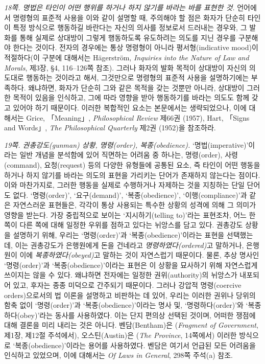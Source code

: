 \documentclass[12pt, oneside]{book}  %
\begin{document}
\emph{18쪽. 명법은 타인이 어떤 행위를 하거나 하지 않기를 바라는 바를
표현한 것.} 언어에서 명령형의 표준적 사용을 이와 같이 설명할 때,
주의해야 할 점은 화자가 단순히 타인이 특정 방식으로 행동하길 바란다는
자신의 의사를 정보로서 드러내는 경우와, 그 발화를 통해 실제로 상대방이
그렇게 행동하도록 유도하려는 의도를 지닌 경우를 구분해야 한다는 것이다.
전자의 경우에는 통상 명령형이 아니라 평서형(indicative mood)이
적절하다(이 구분에 대해서는 Hägerström, \emph{Inquiries into the Nature
of Law and Morals}, 제3장, §4, 116--126쪽 참조). 그러나 화자의 발화
목적이 상대방이 자신의 의도대로 행동하는 것이라고 해서, 그것만으로
명령형의 표준적 사용을 설명하기에는 부족하다. 왜냐하면, 화자가 단순히
그와 같은 목적을 갖는 것뿐만 아니라, 상대방이 그러한 목적이 있음을
인식하고, 그에 따라 영향을 받아 행동하기를 바라는 의도도 함께 갖고
있어야 하기 때문이다. 이러한 복합적인 요소는 본문에서는 생략되었으나,
이에 대해서는 Grice, 「Meaning」, \emph{Philosophical Review} 제66권
(1957), Hart, 「Signs and Words」, \emph{The Philosophical Quarterly}
제2권 (1952)을 참조하라.

\emph{19쪽. 권총강도(gunman) 상황, 명령(order), 복종(obedience).}
`명법(imperative)'이라는 일반 개념을 분석함에 있어 직면하는 어려움 중
하나는, 명령(order), 사령(command), 요청(request) 등의 다양한 유형들에
공통된 요소, 즉 타인이 어떤 행동을 하거나 하지 않기를 바라는 의도의
표현을 가리키는 단어가 존재하지 않는다는 점이다. 이와 마찬가지로, 그러한
행동을 실제로 수행하거나 자제하는 것을 지칭하는 단일 단어도 없다.
`명령(order)', `요구(demand)', `복종(obedience)', `이행(compliance)'과
같은 자연스러운 표현들은, 각각이 통상 사용되는 특수한 상황의 성격에 의해
그 의미가 영향을 받는다. 가장 중립적으로 보이는 `지시하기(telling
to)'라는 표현조차, 어느 한쪽이 다른 쪽에 대해 일정한 우위를 점하고
있다는 뉘앙스를 담고 있다. 권총강도 상황을 설명하기 위해, 우리는
`명령(order)'과 `복종(obedience)'이라는 표현을 선택했는데, 이는 권총강도가
은행원에게 돈을 건네라고 \emph{명령하였다(ordered)}고 말하거나, 은행원이
이에 \emph{복종하였다(obeyed)}고 말하는 것이 자연스럽기 때문이다. 물론,
추상 명사인 `명령(order)'과 `복종(obedience)'이라는 표현은 이 상황을
묘사하기 위해 자연스럽게 쓰이지는 않을 수 있다. 왜냐하면 전자에는 일정한
권위(authority)의 뉘앙스가 내포되어 있고, 후자는 종종 미덕으로 간주되기
때문이다. 그러나 강압적 명령(coercive orders)으로서의 법 이론을 설명하고
비판하는 데 있어, 우리는 이러한 권위나 당위의 함축 없이 `명령(order)'과
`복종(obedience)'이라는 명사 및, `명령하다(order)'와
`복종하다(obey)'라는 동사를 사용하였다. 이는 단지 편의상 선택된 것이며,
어떠한 쟁점에 대해 결론을 미리 내리는 것은 아니다. 벤담(Bentham)은
(\emph{Fragment of Government}, 제1장, 제12절 주석에서),
오스틴(Austin)은 (\emph{The Province}, 14쪽에서) 이러한 방식으로
`복종(obedience)'이라는 용어를 사용하였다. 벤담은 여기서 언급된 모든
어려움을 인식하고 있었으며, 이에 대해서는 \emph{Of Laws in General},
298쪽 주석(a) 참조.
\end{document}
